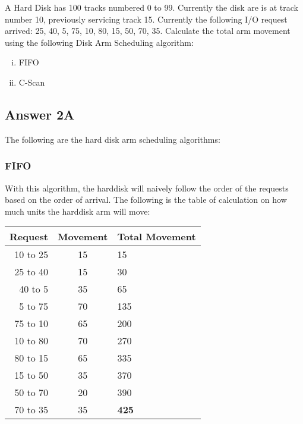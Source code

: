 \documentclass[
  11pt, %
]{assignment}
\begin{document}
\begin{problem}
A Hard Disk has 100 tracks numbered 0 to 99. Currently the disk are is at track number 10, previously servicing track 15. Currently the following I/O request arrived: 25, 40, 5, 75, 10, 80, 15, 50, 70, 35. Calculate the total arm movement using the following Disk Arm Scheduling algorithm:

\begin{enumerate}[i.]
	\item FIFO
	\item C-Scan
\end{enumerate}
\end{problem}

\subsection*{Answer 2A}

The following are the hard disk arm scheduling algorithms:

\subsubsection*{FIFO}

With this algorithm, the harddisk will naively follow the order of the requests based on the order of arrival. The following is the table of calculation on how much units the harddisk arm will move:

\begin{center}
	\begin{tabular}[pos]{r c l}
		\toprule
		\textbf{Request} & \textbf{Movement} & \textbf{Total Movement} \\
		\midrule
		10 to 25         & 15                & 15                      \\
		25 to 40         & 15                & 30                      \\
		40 to 5          & 35                & 65                      \\
		5 to 75          & 70                & 135                     \\
		75 to 10         & 65                & 200                     \\
		10 to 80         & 70                & 270                     \\
		80 to 15         & 65                & 335                     \\
		15 to 50         & 35                & 370                     \\
		50 to 70         & 20                & 390                     \\
		70 to 35         & 35                & \textbf{425}            \\
	\end{tabular}
\end{center}
\end{document}
